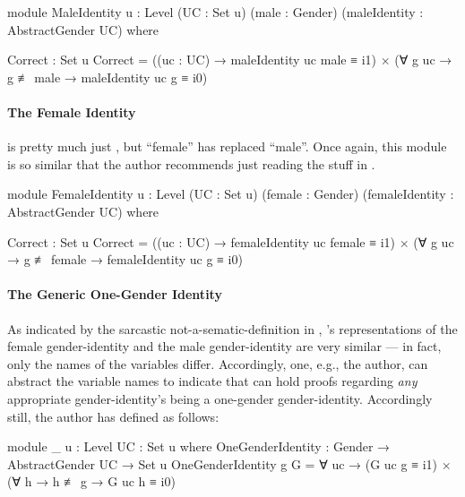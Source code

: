 \documentclass{article}
\theoremstyle{remark}
\begin{document}
\begin{code}
    module MaleIdentity
           {u : Level}
           (UC : Set u)
           (male : Gender)
           (maleIdentity : AbstractGender UC) where

      Correct : Set u
      Correct = ((uc : UC) → maleIdentity uc male ≡ i1)
              × (∀ g uc → g ≢ male → maleIdentity uc g ≡ i0)
\end{code}

\paragraph{The Female Identity}\label{sec:gender8exampleIdentityFemale}
 is pretty much just , but ``female'' has replaced ``male''.  Once again, this module is so similar that the author recommends just reading the stuff in .

\begin{code}
    module FemaleIdentity
           {u : Level}
           (UC : Set u)
           (female : Gender)
           (femaleIdentity : AbstractGender UC) where

      Correct : Set u
      Correct = ((uc : UC) → femaleIdentity uc female ≡ i1)
              × (∀ g uc → g ≢ female → femaleIdentity uc g ≡ i0)
\end{code}

\paragraph{The Generic One-Gender Identity}
As indicated by the sarcastic not-a-sematic-definition in , 's representations of the female gender-identity and the male gender-identity are very similar --- in fact, only the names of the variables differ.  Accordingly, one, e.g., the author, can abstract the variable names to indicate that  can hold proofs regarding \emph{any} appropriate gender-identity's being a one-gender gender-identity.  Accordingly still, the author has defined  as follows:

\begin{code}
    module _ {u : Level} {UC : Set u} where
      OneGenderIdentity : Gender → AbstractGender UC → Set u
      OneGenderIdentity g G =
        ∀ uc → (G uc g ≡ i1) × (∀ h → h ≢ g → G uc h ≡ i0)
\end{code}
\end{document}
